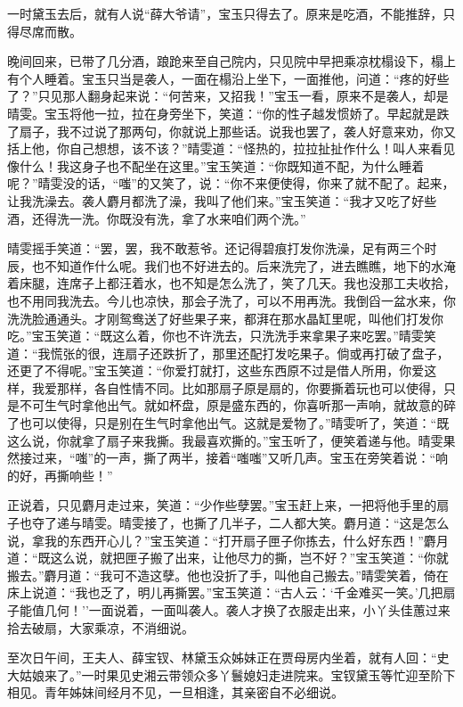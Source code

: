 一时黛玉去后，就有人说``薛大爷请''，宝玉只得去了。原来是吃酒，不能推辞，只得尽席而散。

晚间回来，已带了几分酒，踉跄来至自己院内，只见院中早把乘凉枕榻设下，榻上有个人睡着。宝玉只当是袭人，一面在榻沿上坐下，一面推他，问道：``疼的好些了？''只见那人翻身起来说：``何苦来，又招我！''宝玉一看，原来不是袭人，却是晴雯。宝玉将他一拉，拉在身旁坐下，笑道：``你的性子越发惯娇了。早起就是跌了扇子，我不过说了那两句，你就说上那些话。说我也罢了，袭人好意来劝，你又括上他，你自己想想，该不该？''晴雯道：``怪热的，拉拉扯扯作什么！叫人来看见像什么！我这身子也不配坐在这里。''宝玉笑道：``你既知道不配，为什么睡着呢？''晴雯没的话，``嗤''的又笑了，说：``你不来便使得，你来了就不配了。起来，让我洗澡去。袭人麝月都洗了澡，我叫了他们来。''宝玉笑道：``我才又吃了好些酒，还得洗一洗。你既没有洗，拿了水来咱们两个洗。''

晴雯摇手笑道：``罢，罢，我不敢惹爷。还记得碧痕打发你洗澡，足有两三个时辰，也不知道作什么呢。我们也不好进去的。后来洗完了，进去瞧瞧，地下的水淹着床腿，连席子上都汪着水，也不知是怎么洗了，笑了几天。我也没那工夫收拾，也不用同我洗去。今儿也凉快，那会子洗了，可以不用再洗。我倒舀一盆水来，你洗洗脸通通头。才刚鸳鸯送了好些果子来，都湃在那水晶缸里呢，叫他们打发你吃。''宝玉笑道：``既这么着，你也不许洗去，只洗洗手来拿果子来吃罢。''晴雯笑道：``我慌张的很，连扇子还跌折了，那里还配打发吃果子。倘或再打破了盘子，还更了不得呢。''宝玉笑道：``你爱打就打，这些东西原不过是借人所用，你爱这样，我爱那样，各自性情不同。比如那扇子原是扇的，你要撕着玩也可以使得，只是不可生气时拿他出气。就如杯盘，原是盛东西的，你喜听那一声响，就故意的碎了也可以使得，只是别在生气时拿他出气。这就是爱物了。''晴雯听了，笑道：``既这么说，你就拿了扇子来我撕。我最喜欢撕的。''宝玉听了，便笑着递与他。晴雯果然接过来，``嗤''的一声，撕了两半，接着``嗤嗤''又听几声。宝玉在旁笑着说：``响的好，再撕响些！''

正说着，只见麝月走过来，笑道：``少作些孽罢。''宝玉赶上来，一把将他手里的扇子也夺了递与晴雯。晴雯接了，也撕了几半子，二人都大笑。麝月道：``这是怎么说，拿我的东西开心儿？''宝玉笑道：``打开扇子匣子你拣去，什么好东西！''麝月道：``既这么说，就把匣子搬了出来，让他尽力的撕，岂不好？''宝玉笑道：``你就搬去。''麝月道：``我可不造这孽。他也没折了手，叫他自己搬去。''晴雯笑着，倚在床上说道：``我也乏了，明儿再撕罢。''宝玉笑道：``古人云：`千金难买一笑。'几把扇子能值几何！''一面说着，一面叫袭人。袭人才换了衣服走出来，小丫头佳蕙过来拾去破扇，大家乘凉，不消细说。

至次日午间，王夫人、薛宝钗、林黛玉众姊妹正在贾母房内坐着，就有人回：``史大姑娘来了。''一时果见史湘云带领众多丫鬟媳妇走进院来。宝钗黛玉等忙迎至阶下相见。青年姊妹间经月不见，一旦相逢，其亲密自不必细说。

